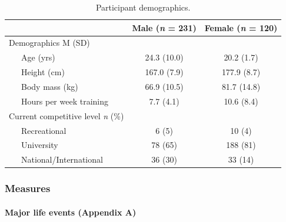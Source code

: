 \documentclass[man,floatsintext]{apa6}
\let\oldparagraph\paragraph
\renewcommand{\paragraph}[1]{\oldparagraph{#1}\mbox{}}
\begin{document}
\begin{table}[H]

\begin{center}
\begin{threeparttable}

\caption{\label{tab:parchar}Participant demographics.}

\begin{tabular}{lcc}
\toprule
  & Male (\textit{n} = 231) & Female (\textit{n} = 120)\\
\midrule
Demographics M (SD) &  & \\
\ \ \ Age (yrs) & 24.3 (10.0) & 20.2 (1.7)\\
\ \ \ Height (cm) & 167.0 (7.9) & 177.9 (8.7)\\
\ \ \ Body mass (kg) & 66.9 (10.5) & 81.7 (14.8)\\
\ \ \ Hours per week training & 7.7 (4.1) & 10.6 (8.4)\\ \midrule
Current competitive level \textit{n} (\%) &  & \\
\ \ \ Recreational & 6 (5) & 10 (4)\\
\ \ \ University & 78 (65) & 188 (81)\\
\ \ \ National/International & 36 (30) & 33 (14)\\
\bottomrule
\end{tabular}

\end{threeparttable}
\end{center}

\end{table}

\newpage

\hypertarget{measures-1}{%
\subsubsection{Measures}\label{measures-1}}

\hypertarget{major-life-events-appendix-a-1}{%
\paragraph{Major life events (Appendix A)}\label{major-life-events-appendix-a-1}}
\end{document}
